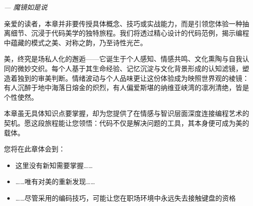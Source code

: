 \begin{flushright}
\textit{--- 魔镜如是说}
\end{flushright}

亲爱的读者，本章并非要传授具体概念、技巧或实战能力，而是引领您体验一种抽离细节、沉浸于代码美学的独特旅程。我们将透过精心设计的代码范例，揭示编程中蕴藏的模式之美、对称之韵，乃至诗性光芒。

美，终究是场私人化的邂逅——它诞生于个人感知、情感共鸣、文化熏陶与自我认同的微妙交织。每个人基于其生命经验、记忆沉淀与文化背景形成的认知滤镜，塑造着独到的审美判断。情绪波动与个人品味更让这份体验成为映照世界观的棱镜：有人沉醉于地中海落日熔金的炽烈，有人偏爱斯堪的纳维亚峡湾的凛冽清绝，皆是个性使然。

本章虽无具体知识点要掌握，却为您提供了在情感与智识层面深度连接编程艺术的契机。愿这段旅程能让您领悟：代码不仅是解决问题的工具，其本身便可成为美的载体。

您将在此章体会到：

\begin{itemize}
\item 
这里没有新知需要掌握……

\item 
……唯有对美的重新发现……

\item 
……尽管采用的编码技巧，可能让您在职场环境中永远失去接触键盘的资格
\end{itemize}



























